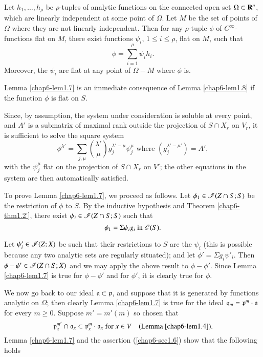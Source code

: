 \begin{lemma}\label{chap6-lem1.8}
Let $h_{1},\ldots,h_{\rho}$ be $\rho$-tuples of analytic functions on the connected open set $\Omega\subset \mathbf{R}^{n}$, which are linearly independent at some point of $\Omega$. Let $M$ be the set of points of $\Omega$ where they are not linearly independent. Then for any $\rho$-tuple $\phi$ of $C^{\infty}$-functions flat on $M$, there exist functions $\psi_{i}$, $1\leq i\leq \rho$, flat on $M$, such that
$$
\phi=\sum\limits^{\rho}_{i=1}\psi_{i}h_{i}.
$$
Moreover, the $\psi_{i}$ are flat at any point of $\Omega-M$ where $\phi$ is.
\end{lemma}

Lemma \ref{chap6-lem1.7} is an immediate consequence of Lemma \ref{chap6-lem1.8} if the function $\phi$ is flat on $S$.

Since, by assumption, the system under consideration is soluble at every point, and $A'$ is a submatrix of maximal rank outside the projection of $S\cap X_{r}$ on $V_{r}$, it is sufficient to solve the square system
$$
\phi^{\lambda'}=\sum\limits_{j,\mu}\binom{\lambda'}{\mu}g^{\lambda'-\mu}_{j}\psi^{\mu}_{j}\text{ where } (g^{\lambda'-\mu'}_{j})=A',
$$
with the $\psi^{\mu}_{j}$ flat on the projection of $S\cap X_{r}$ on $V'$; the other equations in the system are then automatically satisfied.

To prove Lemma \ref{chap6-lem1.7}, we proceed as follows. Let $\phi_{1}\in \mathscr{I}(Z\cap S;S)$ be the restriction of $\phi$ to $S$. By the inductive hypothesis and Theorem \ref{chap6-thm1.2'}, there exist $\psi_{i}\in\mathscr{I}(Z\cap S;S)$ such that
$$
\phi_{1}=\Sigma \psi_{i}g_{i}\text{ in } \mathscr{E}(S).
$$

Let $\psi'_{i}\in \mathscr{I}(Z;X)$ be such that their restrictions to $S$ are the $\psi_{i}$ (this is possible because any two analytic sets are regularly situated); and let $\phi'=\Sigma g_{i}\psi'_{i}$. Then $\phi-\phi'\in \mathscr{I}(Z\cap S;X)$ and we may apply the above result to $\phi-\phi'$. Since Lemma \ref{chap6-lem1.7} is true for $\phi-\phi'$ and for $\phi'$, it is clearly true for $\phi$.

We now go back to our ideal $\mathfrak{a}\subset\mathfrak{p}$, and suppose that it is generated by functions analytic on $\Omega$; then clearly Lemma \ref{chap6-lem1.7} is true for the ideal $\mathfrak{q}_{m}=\mathfrak{p}^{m}\cdot \mathfrak{a}$ for every $m\geq 0$. Suppose $m'=m'(m)$ so chosen that
\setcounter{equation}{8}
\begin{equation}
\mathfrak{p}^{m'}_{x}\cap \mathfrak{a}_{x}\subset \mathfrak{p}^{m}_{x}\cdot \mathfrak{a}_{x}\text{ for } x\in V\quad \text{(Lemma \ref{chap6-lem1.4}).}\label{chap6-eq1.9}
\end{equation}
Lemma \ref{chap6-lem1.7} and the assertion (\ref{chap6-sec1.6}) show that the following holds 

